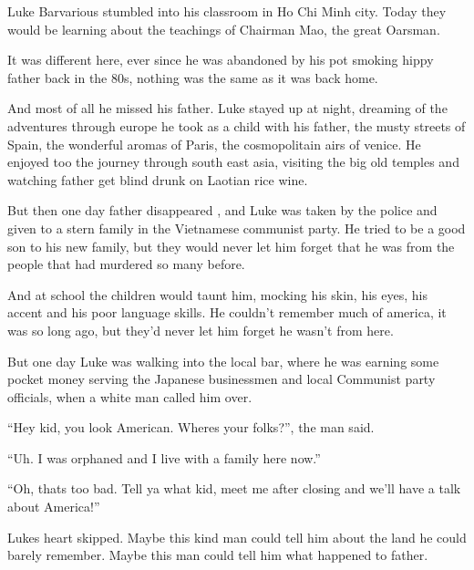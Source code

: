 

Luke Barvarious stumbled into his classroom in Ho Chi Minh city.
Today they would be learning about the teachings of Chairman Mao,
the great Oarsman.



It was different here, ever since he was abandoned by his pot
smoking hippy father back in the 80s, nothing was the same as it
was back home.



And most of all he missed his father. Luke stayed up at night,
dreaming of the adventures through europe he took as a child with
his father, the musty streets of Spain, the wonderful aromas of
Paris, the cosmopolitain airs of venice. He enjoyed too the journey
through south east asia, visiting the big old temples and watching
father get blind drunk on Laotian rice wine.



But then one day father disappeared , and Luke was taken by the
police and given to a stern family in the Vietnamese communist
party. He tried to be a good son to his new family, but they would
never let him forget that he was from the people that had murdered
so many before.



And at school the children would taunt him, mocking his skin, his
eyes, his accent and his poor language skills. He couldn't remember
much of america, it was so long ago, but they'd never let him
forget he wasn't from here.



But one day Luke was walking into the local bar, where he was
earning some pocket money serving the Japanese businessmen and
local Communist party officials, when a white man called him
over.



``Hey kid, you look American. Wheres your folks?'', the man
said.



``Uh. I was orphaned and I live with a family here now.''



``Oh, thats too bad. Tell ya what kid, meet me after closing and
we'll have a talk about America!''



Lukes heart skipped. Maybe this kind man could tell him about the
land he could barely remember. Maybe this man could tell him what
happened to father.



